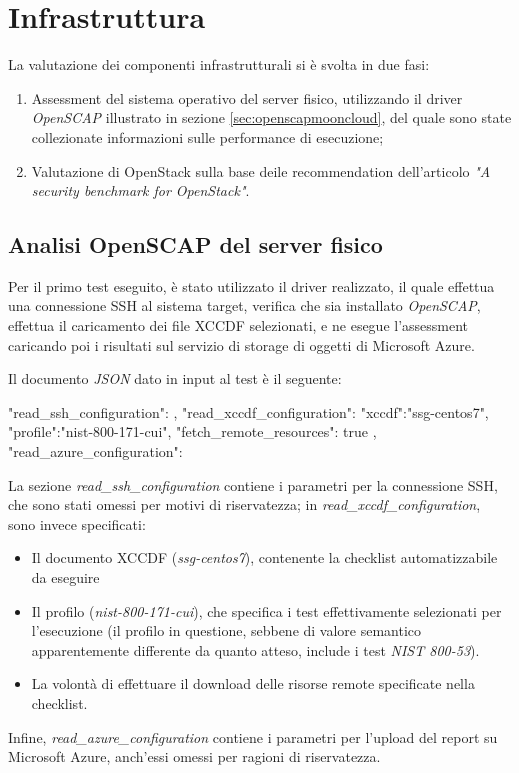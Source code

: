 \documentclass[../main.tex]{subfiles}
\begin{document}
\section{Infrastruttura}
La valutazione dei componenti infrastrutturali si è svolta in due fasi:
\begin{enumerate}
    \item Assessment del sistema operativo del server fisico, utilizzando il driver \textit{OpenSCAP} illustrato in sezione \ref{sec:openscapmooncloud}, del quale sono state collezionate informazioni sulle performance di esecuzione;
    \item Valutazione di OpenStack sulla base deile recommendation dell'articolo \textit{"A security benchmark for OpenStack"}\cite{MyPaper}. 
\end{enumerate}

\subsection{Analisi OpenSCAP del server fisico}

Per il primo test eseguito, è stato utilizzato il driver realizzato, il quale effettua una connessione SSH al sistema target, verifica che sia installato \textit{OpenSCAP}, effettua il caricamento dei file XCCDF selezionati, e ne esegue l'assessment caricando poi i risultati sul servizio di storage di oggetti di Microsoft Azure.

Il documento \textit{JSON} dato in input al test è il seguente:
\begin{js}
{
    "read_ssh_configuration": {
    },
    "read_xccdf_configuration": {
        "xccdf":"ssg-centos7",
        "profile":"nist-800-171-cui",
        "fetch_remote_resources": true
    },
    "read_azure_configuration": {
    }
}
\end{js}
La sezione \textit{read\_ssh\_configuration} contiene i parametri per la connessione SSH, che sono stati omessi per motivi di riservatezza; in \textit{read\_xccdf\_configuration}, sono invece specificati:
\begin{itemize}
    \item Il documento XCCDF (\textit{ssg-centos7}), contenente la checklist automatizzabile da eseguire
    \item Il profilo (\textit{nist-800-171-cui}), che specifica i test effettivamente selezionati per l'esecuzione (il profilo in questione, sebbene di valore semantico apparentemente differente da quanto atteso, include i test \textit{NIST 800-53}).
    \item La volontà di effettuare il download delle risorse remote specificate nella checklist.
\end{itemize}
Infine, \textit{read\_azure\_configuration} contiene i parametri per l'upload del report su Microsoft Azure, anch'essi omessi per ragioni di riservatezza.
\end{document}
